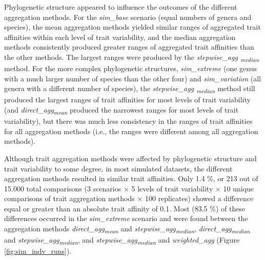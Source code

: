\documentclass[12pt]{article}
\begin{document}
Phylogenetic structure appeared to influence the outcomes of the different aggregation methods. For the \textit{sim\_base} scenario (equal numbers of genera and species), the mean aggregation methods yielded similar ranges of aggregated trait affinities within each level of trait variability, and the median aggregation methods consistently produced greater ranges of aggregated trait affinities than the other methods. The largest ranges were produced by the \textit{stepwise\_agg \textsubscript{median}} method. For the more complex phylogenetic structures, \textit{sim\_extreme} (one genus with a much larger number of species than the other four) and \textit{sim\_variation} (all genera with a different number of species), the \textit{stepwise\_agg \textsubscript{median}} method still produced the largest ranges of trait affinities for most levels of trait variability (and \textit{direct\_agg\textsubscript{mean}} produced the narrowest ranges for most levels of trait variability), but there was much less consistency in the ranges of trait affinities for all aggregation methods (i.e., the ranges were different among all aggregation methods).

Although trait aggregation methods were affected by phylogenetic structure and trait variability to some degree, in most simulated datasets, the different aggregation methods resulted in similar trait affinities. Only 1.4 \%, or 213 out of 15.000 total comparisons (3 scenarios $\times$ 5 levels of trait variability $\times$ 10 unique comparisons of trait aggregation methods $\times$ 100 replicates) showed a difference equal or greater than an absolute trait affinity of 0.1. Most  (83.5 \%) of these differences occurred in the \textit{sim\_extreme} scenario and were found between the aggregation methods \textit{direct\_agg\textsubscript{mean}} and \textit{stepwise\_agg\textsubscript{median}}, \textit{direct\_agg\textsubscript{median}} and \textit{stepwise\_agg\textsubscript{median}}, and \textit{stepwise\_agg\textsubscript{median}} and \textit{weighted\_agg} (Figure \ref{fig:sim_indv_runs}).
\end{document}
